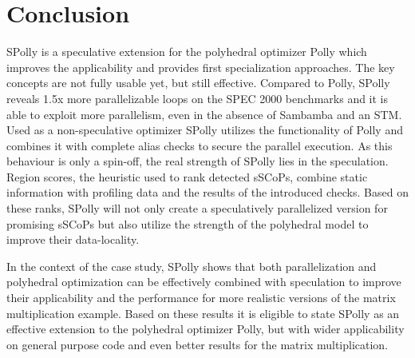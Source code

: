     


\section{Conclusion}
SPolly is a speculative extension for the polyhedral optimizer Polly which 
improves the applicability and provides first specialization approaches. The
key concepts are not fully usable yet, but still effective. 
Compared to Polly, SPolly reveals 1.5x more parallelizable loops 
on the SPEC 2000 benchmarks and it is able to exploit more parallelism,
even in the absence of Sambamba and an STM.
Used as a non-speculative optimizer SPolly utilizes the functionality of 
Polly and combines it with complete alias checks to secure the parallel execution.
As this behaviour is only a spin-off, the real strength of SPolly lies in the speculation. 
Region scores, the heuristic used to rank detected sSCoPs, combine static information
with profiling data and the results of the introduced checks. Based on these ranks,
SPolly will not only create a speculatively parallelized version for promising 
sSCoPs but also utilize the strength of the polyhedral model to improve their 
data-locality. 

In the context of the case study, SPolly shows that both parallelization and 
polyhedral optimization can be effectively combined with speculation to improve 
their applicability and the performance for more realistic versions of the 
matrix multiplication example. Based on these results it is eligible to state 
SPolly as an effective extension to the polyhedral optimizer Polly, but
with wider applicability on general purpose code and even better results for the 
matrix multiplication.
